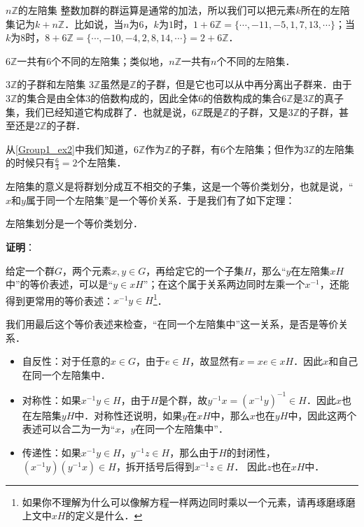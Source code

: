 \begin{example}{$n\mathbb{Z}的左陪集$}\label{Group1_ex2}
整数加群的群运算是通常的加法，所以我们可以把元素$k$所在的左陪集记为$k+n\mathbb{Z}$．比如说，当$n$为$6$，$k$为$1$时，$1+6\mathbb{Z}=\{\cdots, -11, -5, 1, 7, 13, \cdots\}$；当$k$为$8$时，$8+6\mathbb{Z}=\{\cdots, -10, -4, 2, 8, 14, \cdots\}=2+6\mathbb{Z}$．

$6\mathbb{Z}$一共有$6$个不同的左陪集；类似地，$n\mathbb{Z}$一共有$n$个不同的左陪集．


\end{example}

\begin{example}{$3\mathbb{Z}$的子群和左陪集}\label{Group1_ex3}
$3\mathbb{Z}$虽然是$\mathbb{Z}$的子群，但是它也可以从中再分离出子群来．由于$3\mathbb{Z}$的集合是由全体$3$的倍数构成的，因此全体$6$的倍数构成的集合$6\mathbb{Z}$是$3\mathbb{Z}$的真子集，我们已经知道它构成群了．也就是说，$6\mathbb{Z}$既是$\mathbb{Z}$的子群，又是$3\mathbb{Z}$的子群，甚至还是$2\mathbb{Z}$的子群．

从\autoref{Group1_ex2}中我们知道，$6\mathbb{Z}$作为$\mathbb{Z}$的子群，有$6$个左陪集；但作为$3\mathbb{Z}$的左陪集的时候只有$\frac{6}{3}=2$个左陪集．

\end{example}

左陪集的意义是将群划分成互不相交的子集，这是一个等价类划分，也就是说，“$x$和$y$属于同一个左陪集”是一个等价关系．于是我们有了如下定理： 

\begin{theorem}{}\label{Group1_the1}

左陪集划分是一个等价类划分．

\end{theorem}

\textbf{证明}：

给定一个群$G$，两个元素$x, y\in G$，再给定它的一个子集$H$，那么“$y$在左陪集$xH$中”的等价表述，可以是“$y\in xH$”；在这个属于关系两边同时左乘一个$x^{-1}$，还能得到更常用的等价表述：$x^{-1}y\in H$\footnote{如果你不理解为什么可以像解方程一样两边同时乘以一个元素，请再琢磨琢磨上文中$xH$的定义是什么．}．

我们用最后这个等价表述来检查，“在同一个左陪集中”这一关系，是否是等价关系．
\begin{itemize}
\item 自反性：对于任意的$x\in G$，由于$e\in H$，故显然有$x=xe\in xH$．因此$x$和自己在同一个左陪集中．
\item 对称性：如果$x^{-1}y\in H$，由于$H$是个群，故$y^{-1}x=(x^{-1}y)^{-1}\in H$．因此$x$也在左陪集$yH$中．对称性还说明，如果$y$在$xH$中，那么$x$也在$yH$中，因此这两个表述可以合二为一为“$x$，$y$在同一个左陪集中”．
\item 传递性：如果$x^{-1}y\in H$，$y^{-1}z\in H$，那么由于$H$的封闭性，$(x^{-1}y)(y^{-1}x)\in H$，拆开括号后得到$x^{-1}z\in H$． 因此$z$也在$xH$中．
\end{itemize}

